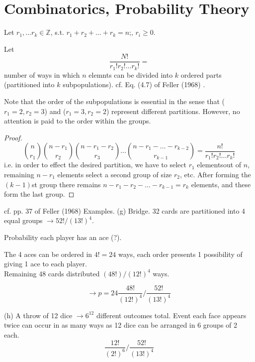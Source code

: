 \part{Combinatorics, Probability Theory}


\begin{theorem}
	Let $r_1,\dots r_k \in \mathbb{Z}$, s.t. $r_1 + r_2 + \dots + r_k = n$;, $r_i \geq 0$.  

Let 
\begin{equation}
\frac{ N! }{r_1! r_2! \dots r_k!} = 
\end{equation}
number of ways in which $n$ elemnts can be divided into $k$ ordered parts (partitioned into $k$ subpopulations).  cf. Eq. (4.7) of Feller (1968)  \cite{dgdt:Fell1968}.  

Note that the order of the subpopulations is essential in the sense that ($r_1 = 2,r_2 =3$) and ($r_1=3,r_2=2$) represent different partitions.  However, no attention is paid to the order within the groups.  

\end{theorem}
\begin{proof}
\begin{equation}
\binom{n}{r_1} \binom{n-r_1}{r_2} \binom{n-r_1-r_2}{r_3} \dots \binom{n-r_1-\dots - r_{k-2} }{ r_{k-1} } = \frac{n!}{ r_1! r_2! \dots r_k! }
\end{equation}
i.e. in order to effect the desired partition, we have to select $r_1$ elementsout of $n$, remaining $n-r_1$ elements select a second group of size $r_2$, etc.  After forming the $(k-1)$st group there remains $n-r_1 -r_2 - \dots - r_{k-1} = r_k$ elements, and these form the last group.  
\end{proof}

cf. pp. 37 of Feller (1968)  \cite{dgdt:Fell1968}
Examples.  (g) Bridge.  32 cards are partitioned into 4 equal groups $\to 52!/(13!)^4$.  

Probability each player has an ace (?).  

The 4 aces can be ordered in $4! = 24$ ways, each order presents 1 possibility of giving 1 ace to each player.  \\
Remaining 48 cards distributed $(48!)/( 12!)^4$ ways.  

\[
\to p = 24 \frac{ 48!}{ (12!)^4 } / \frac{ 52!}{ (13!)^4}
\]

(h) A throw of 12 dice $\to  6^{12}$ different outcomes total.  Event each face appears twice can occur in as many ways as 12 dice can be arranged in 6 groups of 2 each.  
\[
\frac{12!}{(2!)^6} / \frac{ 52!}{ (13!)^4} 
\]

